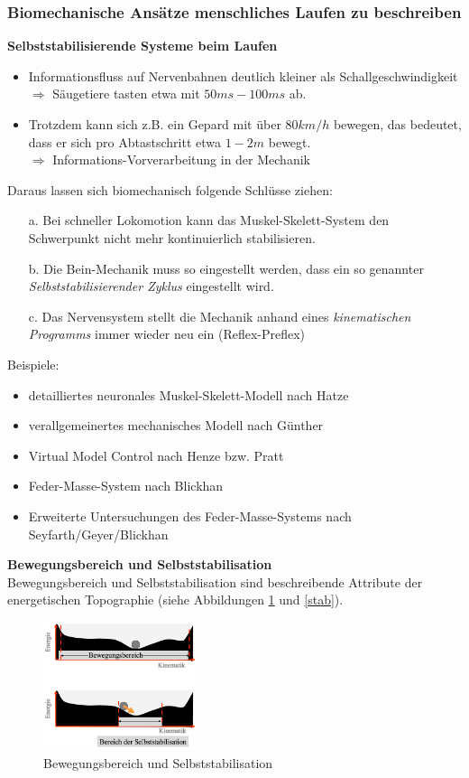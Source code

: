\subsubsection{Biomechanische Ansätze menschliches Laufen zu beschreiben}
\textbf{Selbststabilisierende Systeme beim Laufen}
\begin{itemize}
\item Informationsfluss auf Nervenbahnen deutlich kleiner als Schallgeschwindigkeit\\
$\Rightarrow$ Säugetiere tasten etwa mit $50ms - 100ms$ ab.
\item Trotzdem kann sich z.B. ein Gepard mit über $80 km/h$ bewegen,
das bedeutet, dass er sich pro \glqq Abtastschritt\grqq{} etwa $1-2 m$ bewegt.\\
$\Rightarrow$ Informations-Vorverarbeitung in der \glqq Mechanik\grqq{}
\end{itemize}
Daraus lassen sich biomechanisch folgende Schlüsse ziehen:
\begin{itemize}
\item[a.] Bei schneller Lokomotion kann das Muskel-Skelett-System den Schwerpunkt nicht mehr kontinuierlich stabilisieren.
\item[b.] Die \glqq Bein-Mechanik\grqq{} muss so eingestellt werden, dass ein so genannter \textit{Selbststabilisierender Zyklus} eingestellt wird.
\item[c.] Das Nervensystem stellt die \glqq Mechanik\grqq{} anhand eines \textit{kinematischen Programms} immer wieder neu ein (Reflex-Preflex)
\end{itemize}
Beispiele:
\begin{itemize}
\item detailliertes neuronales Muskel-Skelett-Modell nach Hatze
\item verallgemeinertes mechanisches Modell nach Günther
\item \glqq Virtual Model Control\grqq{} nach Henze bzw. Pratt
\item Feder-Masse-System nach Blickhan
\item Erweiterte Untersuchungen des Feder-Masse-Systems nach Seyfarth/Geyer/Blickhan
\end{itemize}
\noindent
\textbf{Bewegungsbereich und Selbststabilisation}\\
Bewegungsbereich und Selbststabilisation sind beschreibende Attribute der energetischen Topographie (siehe Abbildungen \ref{bew_stab} und \ref{stab}).
\begin{figure}[h!]
	\centering
	\includegraphics[width=0.4\textwidth]{figures/ch06_bew_stab.png}
	\caption{Bewegungsbereich und Selbststabilisation}
	\label{bew_stab}
\end{figure}
